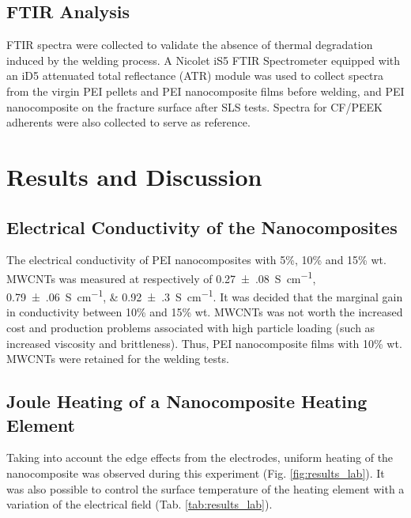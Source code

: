 \documentclass[11pt,review,times]{elsarticle}
\begin{document}
\FloatBarrier
\subsection{FTIR Analysis}

FTIR spectra were collected to validate the absence of thermal degradation induced by the welding process. 
A Nicolet iS5 FTIR Spectrometer equipped with an iD5 attenuated total reflectance (ATR) module was used to collect spectra from the virgin PEI pellets and PEI nanocomposite films before welding, and PEI nanocomposite on the fracture surface after SLS tests. 
Spectra for CF/PEEK adherents were also collected to serve as reference.  

\FloatBarrier
							\section{Results and Discussion}

\subsection{Electrical Conductivity of the Nanocomposites}

The electrical conductivity of PEI nanocomposites with 5\%, 10\% and 15\% wt. MWCNTs was measured at respectively of \SIlist[multi-part-units = single]{0.27(08);0.79(06);0.92(30)}{\siemens\per\cm}. 
It was decided that the marginal gain in conductivity between 10\% and 15\% wt. MWCNTs was not worth the increased cost and production problems associated with high particle loading (such as increased viscosity and brittleness). 
Thus, PEI nanocomposite films with 10\% wt. MWCNTs were retained for the welding tests. 

\subsection{Joule Heating of a Nanocomposite Heating Element}

Taking into account the edge effects from the electrodes, uniform heating of the nanocomposite was observed during this experiment (Fig. \ref{fig:results_lab}). 
It was also possible to control the surface temperature of the heating element with a variation of the electrical field (Tab. \ref{tab:results_lab}). 
\end{document}
